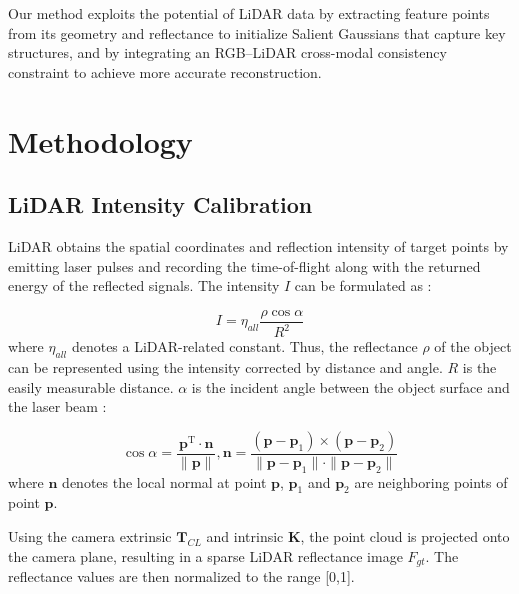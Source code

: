 \documentclass[letterpaper, 10 pt, conference]{ieeeconf}  %
\begin{document}
Our method exploits the potential of LiDAR data by extracting feature points from its geometry and reflectance to initialize Salient Gaussians that capture key structures, and by integrating an RGB–LiDAR cross-modal consistency constraint to achieve more accurate reconstruction.

\section{Methodology}

\subsection{LiDAR Intensity Calibration}

LiDAR obtains the spatial coordinates and reflection intensity of target points by emitting laser pulses and recording the time-of-flight along with the returned energy of the reflected signals. The intensity $I$ can be formulated as \cite{ref36}:

\begin{equation}
	\label{eq1}
I  =\eta_{all}\frac{\rho\cos\alpha}{R^{2}}
\end{equation}
where $\eta_{all}$ denotes a LiDAR-related constant. Thus, the reflectance $\rho$ of the object can be represented using the intensity corrected by distance and angle. $R$ is the easily measurable distance. $\alpha$ is the incident angle between the object surface and the laser beam \cite{ref3}:

\begin{equation}
	\label{eq2}
\cos\alpha = \frac{\mathbf{p}^{\text{T}}\cdot\mathbf{n}}{\|\mathbf{p}\|} ,   \mathbf{n}=\frac{\left(\mathbf{p}-\mathbf{p}_{1}\right) \times\left(\mathbf{p}-\mathbf{p}_{2}\right)}{\|\mathbf{p}-\mathbf{p}_{1}\| \cdot\|\mathbf{p}-\mathbf{p}_{2}\|}
\end{equation}
where $\mathbf{n}$ denotes the local normal at point $\mathbf{p}$, $\mathbf{p}_{1}$ and $\mathbf{p}_{2}$ are neighboring points of point $\mathbf{p}$. 

Using the camera extrinsic $\mathbf{T}_{CL}$ and intrinsic $\mathbf{K}$, the point cloud is projected onto the camera plane, resulting in a sparse LiDAR reflectance image $F_{gt}$.  The reflectance values are then normalized to the range [0,1].
\end{document}
